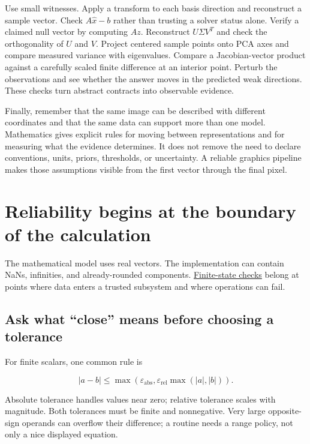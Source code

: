 Use small witnesses. Apply a transform to each basis direction and reconstruct a sample vector. Check \(A\hat x-b\) rather than trusting a solver status alone. Verify a claimed null vector by computing \(Az\). Reconstruct \(U\Sigma V^T\) and check the orthogonality of \(U\) and \(V\). Project centered sample points onto PCA axes and compare measured variance with eigenvalues. Compare a Jacobian-vector product against a carefully scaled finite difference at an interior point. Perturb the observations and see whether the answer moves in the predicted weak directions. These checks turn abstract contracts into observable evidence.

Finally, remember that the same image can be described with different coordinates and that the same data can support more than one model. Mathematics gives explicit rules for moving between representations and for measuring what the evidence determines. It does not remove the need to declare conventions, units, priors, thresholds, or uncertainty. A reliable graphics pipeline makes those assumptions visible from the first vector through the final pixel.

\section{Reliability begins at the boundary of the calculation}\label{02-foundations-ii-ch037-reliability-begins-at-the-boundary-of-the-calculation}

The mathematical model uses real vectors. The implementation can contain NaNs, infinities, and already-rounded components. \hyperref[02-foundations-ii-ch037-reliability-begins-at-the-boundary-of-the-calculation]{Finite-state checks} belong at points where data enters a trusted subsystem and where operations can fail.

\subsection{Ask what ``close'' means before choosing a tolerance}\label{02-foundations-ii-ch037-ask-what-close-means-before-choosing-a-tolerance}

For finite scalars, one common rule is

\[
|a-b|\le\max\left(\varepsilon_{\mathrm{abs}},
\varepsilon_{\mathrm{rel}}\max(|a|,|b|)\right).
\]

Absolute tolerance handles values near zero; relative tolerance scales with magnitude. Both tolerances must be finite and nonnegative. Very large opposite-sign operands can overflow their difference; a routine needs a range policy, not only a nice displayed equation.

